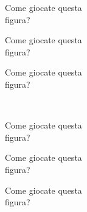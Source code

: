 \documentclass[../corsofiori.tex]{subfiles}
\begin{document}
\begin{minipage}[h][3cm][t]{.3\linewidth}

    Come giocate questa\\ figura?
\end{minipage}
\hfill
\begin{minipage}[h][3cm][t]{.3\linewidth}

    Come giocate questa\\ figura?
\end{minipage}
\hfill
\begin{minipage}[h][3cm][t]{.3\linewidth}

    Come giocate questa\\ figura?
\end{minipage}
\hfill
\bigskip
\\
\begin{minipage}[h][3cm][t]{.3\linewidth}

    Come giocate questa\\ figura?
\end{minipage}
\hfill
\begin{minipage}[h][3cm][t]{.3\linewidth}

    Come giocate questa\\figura?
\end{minipage}
\hfill
\begin{minipage}[h][3cm][t]{.3\linewidth}

    Come giocate questa\\figura?
\end{minipage}
\hfill
\end{document}

